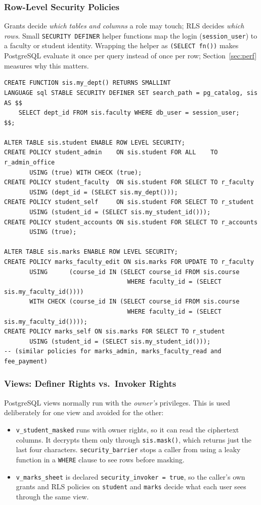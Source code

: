 \documentclass[11pt,a4paper]{report}
\begin{document}
\subsubsection{Row-Level Security Policies}
Grants decide \emph{which tables and columns} a role may touch; RLS decides \emph{which rows}. Small \texttt{SECURITY DEFINER} helper functions map the login (\texttt{session\_user}) to a faculty or student identity. Wrapping the helper as \texttt{(SELECT fn())} makes PostgreSQL evaluate it once per query instead of once per row; Section~\ref{sec:perf} measures why this matters.

\begin{lstlisting}[caption={Identity helper and RLS policies}]
CREATE FUNCTION sis.my_dept() RETURNS SMALLINT
LANGUAGE sql STABLE SECURITY DEFINER SET search_path = pg_catalog, sis AS $$
    SELECT dept_id FROM sis.faculty WHERE db_user = session_user;
$$;

ALTER TABLE sis.student ENABLE ROW LEVEL SECURITY;
CREATE POLICY student_admin    ON sis.student FOR ALL    TO r_admin_office
       USING (true) WITH CHECK (true);
CREATE POLICY student_faculty  ON sis.student FOR SELECT TO r_faculty
       USING (dept_id = (SELECT sis.my_dept()));
CREATE POLICY student_self     ON sis.student FOR SELECT TO r_student
       USING (student_id = (SELECT sis.my_student_id()));
CREATE POLICY student_accounts ON sis.student FOR SELECT TO r_accounts
       USING (true);

ALTER TABLE sis.marks ENABLE ROW LEVEL SECURITY;
CREATE POLICY marks_faculty_edit ON sis.marks FOR UPDATE TO r_faculty
       USING      (course_id IN (SELECT course_id FROM sis.course
                                  WHERE faculty_id = (SELECT sis.my_faculty_id())))
       WITH CHECK (course_id IN (SELECT course_id FROM sis.course
                                  WHERE faculty_id = (SELECT sis.my_faculty_id())));
CREATE POLICY marks_self ON sis.marks FOR SELECT TO r_student
       USING (student_id = (SELECT sis.my_student_id()));
-- (similar policies for marks_admin, marks_faculty_read and fee_payment)
\end{lstlisting}

\subsubsection{Views: Definer Rights vs.\ Invoker Rights}
PostgreSQL views normally run with the \emph{owner's} privileges. This is used deliberately for one view and avoided for the other:
\begin{itemize}
    \item \texttt{v\_student\_masked} runs with owner rights, so it can read the ciphertext columns. It decrypts them only through \texttt{sis.mask()}, which returns just the last four characters. \texttt{security\_barrier} stops a caller from using a leaky function in a \texttt{WHERE} clause to see rows before masking.
    \item \texttt{v\_marks\_sheet} is declared \texttt{security\_invoker = true}, so the caller's own grants and RLS policies on \texttt{student} and \texttt{marks} decide what each user sees through the same view.
\end{itemize}
\end{document}
